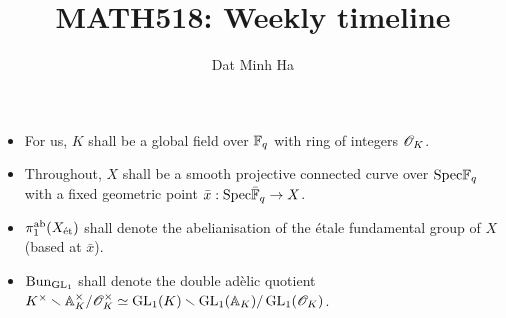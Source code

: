 
\usepackage{soul}





	\title{\textbf{MATH518: Weekly timeline}}
	
	\author{Dat Minh Ha}
	\maketitle
	
	\begin{convention}
	    \noindent
	    \begin{itemize}
	        \item For us, $K$ shall be a global field over $\mathbb{F}_q$ with ring of integers $\mathscr{O}_K$.
	        \item Throughout, $X$ shall be a smooth projective connected curve over $\mathrm{Spec} \mathbb{F}_q$ with a fixed geometric point $\bar{x}: \mathrm{Spec} \bar{\mathbb{F}}_q \to X$.
	        \item $\pi_1^{\mathrm{ab}}(X_{\mathrm{\acute{e}t}})$ shall denote the abelianisation of the \'etale fundamental group of $X$ (based at $\bar{x}$).
	        \item $\mathrm{Bun}_{\operatorname{GL}_1}$ shall denote the double ad\`elic quotient $K^{\x}\setminus\A_K^{\x}/\scrO_K^{\x} \cong \GL_1(K)\setminus\GL_1(\A_K)/\GL_1(\scrO_K)$.
	    \end{itemize}
	\end{convention}
	
